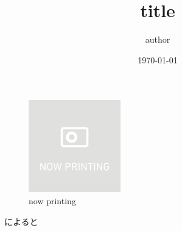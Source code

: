 \documentclass[dvipdfmx, paper=a4, fontsize=10pt]{jlreq}
\title{title}
\author{author}
\date{\today}
\begin{document}
    \maketitle

    \begin{figure}
        \centering
        \includegraphics[width=40mm]{figs/nowprinting.png}
        \caption{now printing}
    \end{figure}

    \cite{fuga}によると\cite{fuga, hoge}

    
    
\end{document}
